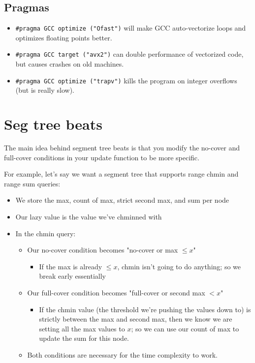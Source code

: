 	\subsection{Pragmas}
		\begin{itemize}
			\item \lstinline{#pragma GCC optimize ("Ofast")} will make GCC auto-vectorize loops and optimizes floating points better.
			\item \lstinline{#pragma GCC target ("avx2")} can double performance of vectorized code, but causes crashes on old machines.
			\item \lstinline{#pragma GCC optimize ("trapv")} kills the program on integer overflows (but is really slow).
		\end{itemize}

\section{Seg tree beats}
	The main idea behind segment tree beats is that you modify the no-cover and full-cover conditions in your update function to be more specific.

	For example, let's say we want a segment tree that supports range chmin and range sum queries:
	
	\begin{itemize}
		\item We store the max, count of max, strict second max, and sum per node
		\item Our lazy value is the value we've chminned with
		\item In the chmin query:
		\begin{itemize}
			\item Our no-cover condition becomes "no-cover or max $\le x$"
			\begin{itemize}
				\item If the max is already $\le x$, chmin isn't going to do anything; so we break early essentially
			\end{itemize}
			\item Our full-cover condition becomes "full-cover or second max $< x$"
			\begin{itemize}
				\item If the chmin value (the threshold we're pushing the values down to) is strictly between the max and second max, then we know we are setting all the max values to $x$; so we can use our count of max to update the sum for this node.
			\end{itemize}
			\item Both conditions are necessary for the time complexity to work.
		\end{itemize}
	\end{itemize}

